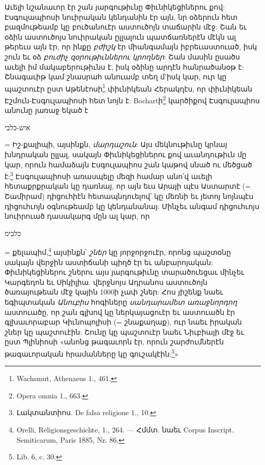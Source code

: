 \documentclass{article}
\begin{document}
{Աւելի նշանաւոր էր շան յարգութիւնը Փիւնիկեցիներու քով: Էսգուլապիոսի նուիրական կենդանին էր այն, նր օձերուն հետ բազմութեամբ կը բուծանուէր աստուծոյն տաճարին մէջ: Շան եւ օձին աստուծոյս նուիրական ըլլալուն պատճառներէն մէկն ալ թերեւս այն էր, որ ինքը \emph{բժիշկ} էր միանգամայն իբրեւաստուած, իսկ շուն եւ օձ \emph{բուժիչ զօրութիւններու կրողներ}: Շան մասին ըսածս աւելի իմ մակաբերութիւնս է, իսկ օձինը արդէն հանրածանօթ է: Շնագաւիթ կամ շնասրահ անուամբ տեղ մ'իսկ կար, ուր կը պաշտուէր ըստ Աթենէոսի\footnote{Wachsmut, Athenaeus 1., 461.} փիւնիկեան Հերակղէս, որ փիւնիկեան Էշմուն-Էսգուլապիոսի հետ նոյն է: Bochartի\footnote{Opera omnia 1., 663.} կարծիքով Էսգուլապիոս անունը յառաջ եկած է \begin{hebrewfont}איש-כלבי\end{hebrewfont} = Իշ-քալիպի, այսինքն, \emph{մարդաշուն}: Այս մեկնութիւնը կրնայ խնդրական ըլլալ, սակայն Փիւնիկեցիներու քով աւանդութիւն մը կար, որուն համաձայն Էսգուլապիոս շան կաթով սնած ու մեծցած է:\footnote{Լակտանտիոս. De falsa religione 1., 10.} Էսգուլապիոսի առասպելը մեզի համար անո՛վ աւելի հետաքրքրական կը դառնայ, որ այն եւս Արայի պէս Աստարտէ (= Շամիրամ) դիցուհիէն հետապնդուելով՝ կը մեռնի եւ յետոյ նոյնպէս դիցուհւոյն օգնութեամբ կը կենդանանայ: Մինչեւ անգամ դիցուհւոյս նուիրուած դասակարգ մըն ալ կար, որ \begin{hebrewfont}כלבימ\end{hebrewfont} = քելապիմ,\footnote{Orelli, Religionsgeschichte, 1., 264. — Հմմտ. նաեւ Corpus Inscript. Semiticarum, Paris 1885, Nr. 86.} այսինքն՝ \emph{շներ} կը յորջորջուէր, որոնց պաշտօնը սակայն վերջին աստիճանի պիղծ էր եւ անբարոյական: Փիւնիկեցիներու շներու այս յարգութիւնը տարածուեցաւ մինչեւ Կարգեդոն եւ Սիկիլիա. վերջնոյս Ադրանոս աստուծոյն ծառայութեան մէջ կային 1000ի չափ շներ: Հոս յիշենք նաեւ եգիպտական \emph{Անուբիս} հոգիները \emph{սանդարամետ առաջնորդող} աստուածը, որ շան գլխով կը ներկայացուէր եւ աստուածն էր գլխաւորաբար Կիւնոպոլիսի (= շնաքաղաք), ուր նաեւ իրական շներ կը պաշտուէին: Շունը կը պաշտուէր նաեւ Նիւբիայի մէջ եւ ըստ Պլինիոսի «անոնց թագաւորն էր, որուն շարժումներէն թագաւորական հրամանները կը գուշակէին:\footnote{Lib. 6, c. 30.}»

}
\end{document}
